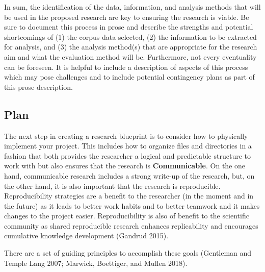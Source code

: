 \documentclass[
  letterpaper,
]{scrbook}
\begin{document}
In sum, the identification of the data, information, and analysis
methods that will be used in the proposed research are key to ensuring
the research is viable. Be sure to document this process in prose and
describe the strengths and potential shortcomings of (1) the corpus data
selected, (2) the information to be extracted for analysis, and (3) the
analysis method(s) that are appropriate for the research aim and what
the evaluation method will be. Furthermore, not every eventuality can be
foreseen. It is helpful to include a description of aspects of this
process which may pose challenges and to include potential contingency
plans as part of this prose description.

\hypertarget{plan}{%
\subsection{Plan}\label{plan}}

The next step in creating a research blueprint is to consider how to
physically implement your project. This includes how to organize files
and directories in a fashion that both provides the researcher a logical
and predictable structure to work with but also ensures that the
research is \textbf{Communicable}. On the one hand, communicable
research includes a strong write-up of the research, but, on the other
hand, it is also important that the research is reproducible.
Reproducibility strategies are a benefit to the researcher (in the
moment and in the future) as it leads to better work habits and to
better teamwork and it makes changes to the project easier.
Reproducibility is also of benefit to the scientific community as shared
reproducible research enhances replicability and encourages cumulative
knowledge development (Gandrud 2015).

There are a set of guiding principles to accomplish these goals
(Gentleman and Temple Lang 2007; Marwick, Boettiger, and Mullen 2018).
\end{document}
